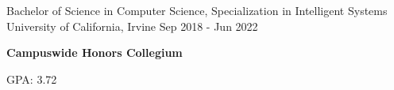 
\begin{cventries}
  \cventry
    {Bachelor of Science in Computer Science, Specialization in Intelligent Systems} %
    {University of California, Irvine} %
    {} %
    {Sep 2018 - Jun 2022} %
    {
      \begin {cvitems}
        \item{\textbf{Campuswide Honors Collegium}}
        \item {GPA: 3.72}
      \end{cvitems}
    }
\end{cventries}
